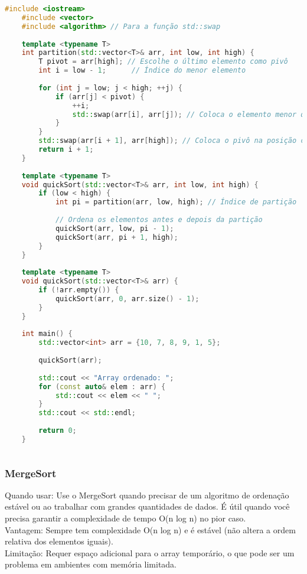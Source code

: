 \documentclass{article}
\begin{document}
\begin{lstlisting}[language=C++, caption=quick sort]
    #include <iostream>
    #include <vector>
    #include <algorithm> // Para a função std::swap
    
    template <typename T>
    int partition(std::vector<T>& arr, int low, int high) {
        T pivot = arr[high]; // Escolhe o último elemento como pivô
        int i = low - 1;      // Índice do menor elemento
    
        for (int j = low; j < high; ++j) {
            if (arr[j] < pivot) {
                ++i;
                std::swap(arr[i], arr[j]); // Coloca o elemento menor que o pivô na posição correta
            }
        }
        std::swap(arr[i + 1], arr[high]); // Coloca o pivô na posição correta
        return i + 1;
    }
    
    template <typename T>
    void quickSort(std::vector<T>& arr, int low, int high) {
        if (low < high) {
            int pi = partition(arr, low, high); // Índice de partição
    
            // Ordena os elementos antes e depois da partição
            quickSort(arr, low, pi - 1);
            quickSort(arr, pi + 1, high);
        }
    }
    
    template <typename T>
    void quickSort(std::vector<T>& arr) {
        if (!arr.empty()) {
            quickSort(arr, 0, arr.size() - 1);
        }
    }
    
    int main() {
        std::vector<int> arr = {10, 7, 8, 9, 1, 5};
    
        quickSort(arr);
    
        std::cout << "Array ordenado: ";
        for (const auto& elem : arr) {
            std::cout << elem << " ";
        }
        std::cout << std::endl;
    
        return 0;
    }
    
\end{lstlisting}

\subsubsection{MergeSort}

Quando usar: Use o MergeSort quando precisar de um algoritmo de ordenação estável ou ao trabalhar com grandes quantidades de dados. É útil quando você precisa garantir a complexidade de tempo O(n log n) no pior caso.
\\Vantagem: Sempre tem complexidade O(n log n) e é estável (não altera a ordem relativa dos elementos iguais).
\\Limitação: Requer espaço adicional para o array temporário, o que pode ser um problema em ambientes com memória limitada.
\end{document}
